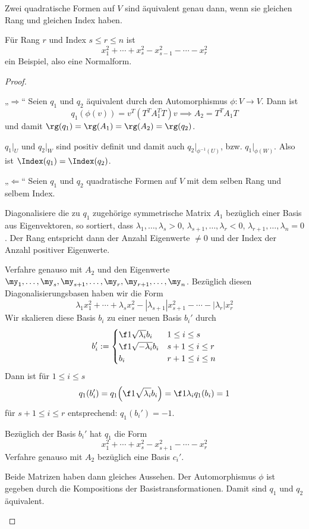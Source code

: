 \documentclass{mycourse}
\begin{document}
\begin{thm}
	\label{thm:15.10}
	Zwei quadratische Formen auf $V$ sind äquivalent genau dann, wenn sie gleichen Rang und gleichen Index haben.
	\begin{note}
		Für Rang $r$ und Index $s \le r \le n$ ist
		\[
			x_1^2 + \dotsb + x_s^2 - x_{s-1}^2 - \dotsb - x_r^2
		\]
		ein Beispiel, also eine Normalform.
	\end{note}
	\begin{proof}
		\begin{seg}{„$\Longrightarrow$“}
			Seien $q_1$ und $q_2$ äquivalent durch den Automorphismus $\phi: V \to V$.
			Dann ist
			\[
				q_1(\phi(v)) = v^T(T^TA_1^TT)v  \implies A_2 = T^TA_1T
			\]
			und damit $\rg(q_1) = \rg(A_1) = \rg(A_2) = \rg(q_2)$.
			
			$q_1|_U$ und $q_2|_W$ sind positiv definit und damit auch $q_2|_{\phi^{-1}(U)}$, bzw. $q_1|_{\phi(W)}$.
			Also ist $\Index(q_1) = \Index(q_2)$.
		\end{seg}
		\begin{seg}{„$\Longleftarrow$“}
			Seien $q_1$ und $q_2$ quadratische Formen auf $V$ mit dem selben Rang und selbem Index.

			Diagonalisiere die zu $q_1$ zugehörige symmetrische Matrix $A_1$ bezüglich einer Basis aus Eigenvektoren, so sortiert, dass $\lambda_1, \dotsc, \lambda_s > 0$, $\lambda_{s+1},\dotsc,\lambda_r < 0$, $\lambda_{r+1},\dotsc,\lambda_n = 0$.
			Der Rang entspricht dann der Anzahl Eigenwerte $\neq 0$ und der Index der Anzahl positiver Eigenwerte.

			Verfahre genauso mit $A_2$ und den Eigenwerte $\my_1,\dotsc,\my_s,\my_{s+1},\dotsc,\my_{r},\my_{r+1},\dotsc,\my_{n}$.
			Bezüglich diesen Diagonalisierungsbasen haben wir die Form
			\[
				\lambda_1x_1^2 + \dotsb + \lambda_sx_s^2 - |\lambda_{s+1}|x_{s+1}^2 - \dotsb - |\lambda_r|x_r^2
			\]
			Wir skalieren diese Basis $b_i$ zu einer neuen Basis $b_i'$ durch
			\[
				b_i' := \begin{cases} \f 1{\sqrt{\lambda_i}}b_i & 1\le i \le s\\
					\f 1{\sqrt{-\lambda_i}} b_i & s+1\le i\le r\\
					b_i & r+1 \le i \le n
				\end{cases}
			\]
			Dann ist für $1\le i \le s$
			\[
				q_1(b_i') =  q_1\Big( \f 1{\sqrt{\lambda_i}} b_i\Big) = \f 1{\lambda_i} q_1(b_i) = 1
			\]
			für $s+1\le i \le r$ entsprechend: $q_1(b_i') = -1$.

			Bezüglich der Basis $b_i'$ hat $q_1$ die Form
			\[
				x_1^2 + \dotsb + x_s^2 - x_{s+1}^2 - \dotsb - x_r^2
			\]
			Verfahre genauso mit $A_2$ bezüglich eine Basis $c_i'$.

			Beide Matrizen haben dann gleiches Aussehen.
			Der Automorphismus $\phi$ ist gegeben durch die Kompositions der Basistransformationen.
			Damit sind $q_1$ und $q_2$ äquivalent.
		\end{seg}
	\end{proof}
\end{thm}
\end{document}
